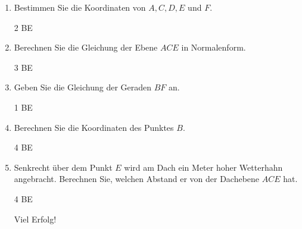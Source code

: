 \documentclass[a4paper,12pt]{article}
\begin{document}
\begin{enumerate}[label={\alph*)}]
\item Bestimmen Sie die Koordinaten von $A, C, D, E$ und $F$.
\begin{flushright}2 BE \end{flushright}
\item Berechnen Sie die Gleichung der Ebene $ACE$ in Normalenform.
\begin{flushright}3 BE \end{flushright}
\item Geben Sie die Gleichung der Geraden $BF$ an.
\begin{flushright}1 BE \end{flushright}
\item Berechnen Sie die Koordinaten des Punktes $B$. 
\begin{flushright}4 BE \end{flushright}
\item Senkrecht über dem Punkt $E$ wird am Dach ein Meter hoher Wetterhahn angebracht. Berechnen Sie, welchen Abstand er von der Dachebene $ACE$ hat.
\begin{flushright}4 BE \end{flushright}
\begin{flushright}Viel Erfolg! \end{flushright}

\end{enumerate}






\end{document}
